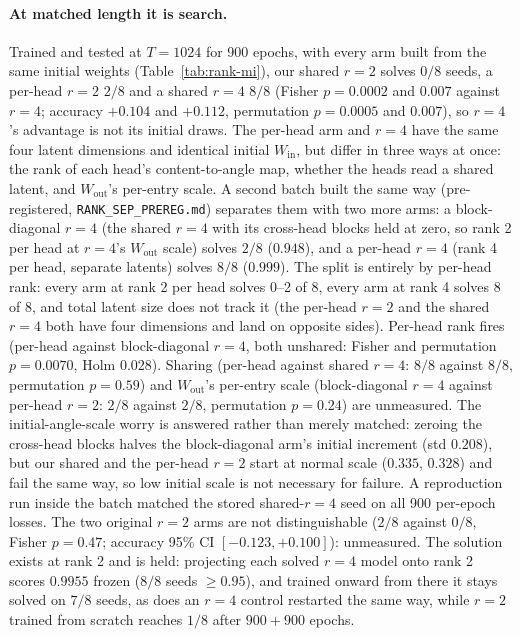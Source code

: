 \documentclass[10pt]{article}
\begin{document}
\paragraph{At matched length it is search.} Trained and tested at $T=1024$ for 900 epochs, with every arm
built from the same initial weights (Table~\ref{tab:rank-mi}), our shared $r=2$ solves $0/8$ seeds, a
per-head $r=2$ $2/8$ and a shared $r=4$ $8/8$ (Fisher $p=0.0002$ and $0.007$ against $r=4$; accuracy
$+0.104$ and $+0.112$, permutation $p=0.0005$ and $0.007$), so $r=4$'s advantage is not its initial draws.
The per-head arm and $r=4$ have the same four latent dimensions and identical initial $W_{\mathrm{in}}$, but
differ in three ways at once: the rank of each head's content-to-angle map, whether the heads read a shared
latent, and $W_{\mathrm{out}}$'s per-entry scale. A second batch built the same way (pre-registered,
\texttt{RANK\_SEP\_PREREG.md}) separates them with two more arms: a block-diagonal $r=4$ (the shared $r=4$
with its cross-head blocks held at zero, so rank 2 per head at $r=4$'s $W_{\mathrm{out}}$ scale) solves $2/8$
($0.948$), and a per-head $r=4$ (rank 4 per head, separate latents) solves $8/8$ ($0.999$). The split is
entirely by per-head rank: every arm at rank 2 per head solves 0--2 of 8, every arm at rank 4 solves 8 of 8,
and total latent size does not track it (the per-head $r=2$ and the shared $r=4$ both have four dimensions and
land on opposite sides). Per-head rank fires (per-head against block-diagonal $r=4$, both unshared: Fisher and
permutation $p=0.0070$, Holm $0.028$). Sharing (per-head against shared $r=4$: $8/8$ against $8/8$,
permutation $p=0.59$) and $W_{\mathrm{out}}$'s per-entry scale (block-diagonal $r=4$ against per-head $r=2$:
$2/8$ against $2/8$, permutation $p=0.24$) are unmeasured. The initial-angle-scale worry is answered rather
than merely matched: zeroing the cross-head blocks halves the block-diagonal arm's initial increment (std
$0.208$), but our shared and the per-head $r=2$ start at normal scale ($0.335$, $0.328$) and fail the same
way, so low initial scale is not necessary for failure. A reproduction run inside the batch matched the
stored shared-$r=4$ seed on all 900 per-epoch losses. The two original $r=2$ arms are
not distinguishable ($2/8$ against $0/8$, Fisher $p=0.47$; accuracy 95\% CI $[-0.123,+0.100]$): unmeasured. The
solution exists at rank 2 and is held: projecting each solved $r=4$ model onto rank 2 scores $0.9955$
frozen ($8/8$ seeds $\ge0.95$), and trained onward from there it stays solved on $7/8$ seeds, as does an
$r=4$ control restarted the same way, while $r=2$ trained from scratch reaches $1/8$ after $900+900$ epochs.
\end{document}
